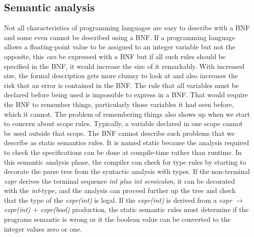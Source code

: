 \subsection{Semantic analysis}
Not all characteristics of programming languages are easy to describe with a BNF and some even cannot be described using a BNF. If a programming language allows a floating-point value to be assigned to an integer variable but not the opposite, this \textit{can} be expressed with a BNF but if all such rules should be specified in the BNF, it would increase the size of it remarkably. With increased size, the formal description gets more clumsy to look at and also increases the risk that an error is contained in the BNF.
The rule that all variables must be declared before being used is impossible to express in a BNF. That would require the BNF to remember things, particularly those variables it had seen before, which it cannot. The problem of remembering things also shows up when we start to concern about scope rules. Typically, a variable declared in one scope cannot be used outside that scope. The BNF cannot describe such problems that we describe as static semantics rules. It is named static because the analysis required to check the specifications can be done at compile-time rather than runtime\cite[p. 153]{sebesta2013}.
In this semantic analysis phase, the compiler can check for type rules by starting to decorate the parse tree from the syntactic analysis with types. If the non-terminal \textit{expr} derives the terminal sequence \textit{int} \textit{plus} \textit{int} \textit{semicolon}, it can be decorated with the \textit{int}-type, and the analysis can proceed further up the tree and check that the type of the \textit{expr(int)} is legal. If the \textit{expr(int)} is derived from a \textit{expr} $\rightarrow$ \textit{expr(int)} +  \textit{expr(bool)} production, the static semantic rules must determine if the programs semantic is wrong or it the boolean value can be converted to the integer values zero or one.

